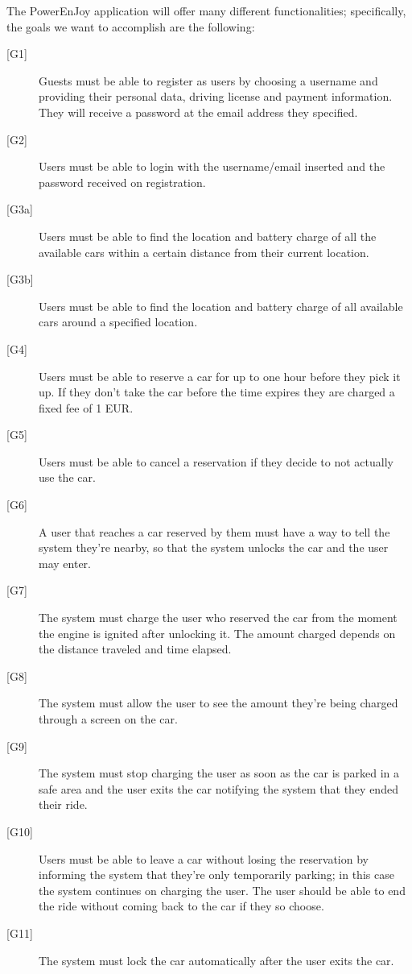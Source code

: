\documentclass[english]{article}
\begin{document}
The PowerEnJoy application will offer many different functionalities; specifically, the goals we want to accomplish are the following:
\begin{description}
	\item[{[G1]}]{Guests must be able to register as users by choosing a username and providing their personal data, driving license and payment information. They will receive a password at the email address they specified.}
	\item[{[G2]}]{Users must be able to login with the username/email inserted and the password received on registration.}
	\item[{[G3a]}]{Users must be able to find the location and battery charge of all the available cars within a certain distance from their current location.}
	\item[{[G3b]}]{Users must be able to find the location and battery charge of all available cars around a specified location.}
	\item[{[G4]}]{Users must be able to reserve a car for up to one hour before they pick it up. If they don't take the car before the time expires they are charged a fixed fee of 1 EUR.}
	\item[{[G5]}]{Users must be able to cancel a reservation if they decide to not actually use the car.}
	\item[{[G6]}]{A user that reaches a car reserved by them must have a way to tell the system they’re nearby, so that the system unlocks the car and the user may enter.}
	\item[{[G7]}]{The system must charge the user who reserved the car from the moment the engine is ignited after unlocking it. The amount charged depends on the distance traveled and time elapsed.}
	\item[{[G8]}]{The system must allow the user to see the amount they’re being charged through a screen on the car.}
	\item[{[G9]}]{The system must stop charging the user as soon as the car is parked in a safe area and the user exits the car notifying the system that they ended their ride.}
	\item[{[G10]}]{Users must be able to leave a car without losing the reservation by informing the system that they’re only temporarily parking; in this case the system continues on charging the user. The user should be able to end the ride without coming back to the car if they so choose.}
	\item[{[G11]}]{The system must lock the car automatically after the user exits the car.}

\end{description}
\end{document}
